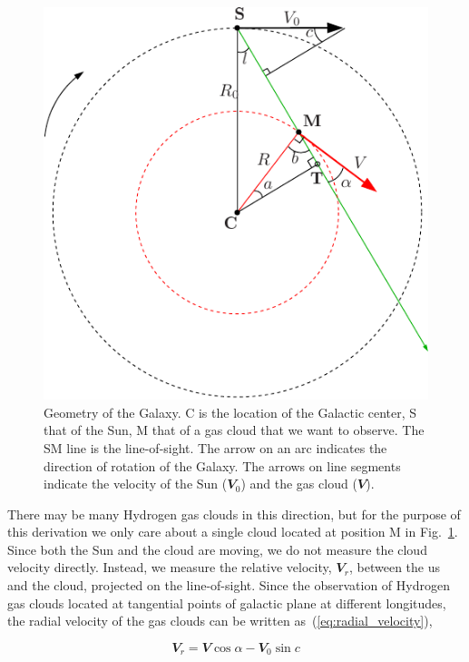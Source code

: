 \documentclass[fleqn,usenatbib]{mnras}
\begin{document}
\begin{figure}
 \includegraphics[width=\columnwidth]{galgeom}
 \caption{Geometry of the Galaxy. C is the location of the Galactic center, S that of the Sun, M
that of a gas cloud that we want to observe. The SM line is the line-of-sight. The arrow
on an arc indicates the direction of rotation of the Galaxy. The arrows on line segments
indicate the velocity of the Sun ($\mathbfit{V}_{0}$) and the gas cloud ($\mathbfit{V}$).}
 \label{fig:galgeo_figure}
\end{figure}

There may be many Hydrogen gas clouds in this direction, but for the purpose of this derivation we only care about a single cloud located at position M in Fig.~\ref{fig:galgeo_figure}. Since both the Sun and the cloud are moving, we do not measure the cloud velocity directly. Instead, we measure the relative velocity, $\mathbfit{V}_{r}$, between the us and the cloud, projected on the line-of-sight. Since the observation of Hydrogen gas clouds located at tangential points of galactic plane at different longitudes, the radial velocity of the gas clouds can be written as~(\ref{eq:radial_velocity}),

\begin{equation}
  \mathbfit{V}_{r}=\mathbfit{V}\cos\alpha-\mathbfit{V}_{0}\sin c
  \label{eq:radial_velocity}
\end{equation}
\end{document}
